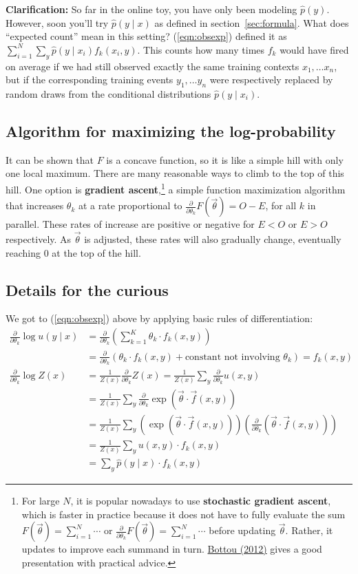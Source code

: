\documentclass[11pt]{article}
\newcommand{\vtheta}{\vec{\theta}}
\newcommand{\ph}{\hat{p}}
\newcommand{\diffk}{\frac{\partial}{\partial \theta_k}}
\begin{document}
{\bf Clarification:} So far in the online toy, you have only been
modeling $\ph(y)$.  However, soon you'll try $\ph(y\mid x)$ as
defined in section~\ref{sec:formula}.  What does ``expected count'' mean in this
setting?  (\ref{eqn:obsexp}) defined it as $\sum_{i=1}^N \sum_y
\ph(y\mid x_i) f_k(x_i,y)$.  This counts how many times $f_k$ would
have fired on average if we had still observed exactly the same
training contexts $x_1,\ldots x_n$, but if the corresponding training events
$y_1,\ldots y_n$ were respectively replaced by random draws from the
conditional distributions $\ph(y \mid x_i)$.

\subsection{Algorithm for maximizing the log-probability}

It can be shown that $F$ is a concave function, so it is like a simple hill with only one local maximum.  There are many reasonable ways to climb to the top of this hill.  One option is {\bf gradient ascent},\footnote{\label{fn:sgd}For large $N$, it is popular nowadays to use
  {\bf stochastic gradient ascent}, which is faster in practice because it does not have to fully evaluate the sum $F(\vtheta) = \sum_{i=1}^N \cdots$ or $\diffk F(\vtheta) = \sum_{i=1}^N \cdots$ before updating $\vtheta$.  Rather, it updates to improve each summand in turn.  \href{http://research.microsoft.com/pubs/192769/tricks-2012.pdf}{Bottou (2012)} gives a good presentation with practical advice.} a
simple function maximization algorithm that increases $\theta_k$ at a
rate proportional to $\diffk F(\vtheta)=O-E$, for all $k$ in parallel.
These rates of increase are positive or negative for $E < O$ or $E >
O$ respectively.  As $\vtheta$ is adjusted, these rates will also
gradually change, eventually reaching 0 at the top of the hill.

\subsection{Details for the curious}

We got to (\ref{eqn:obsexp}) above by applying basic rules
of differentiation:
\begin{align}
  \diffk \log u(y \mid x)
  &= \diffk \left( \sum_{k=1}^K \theta_k \cdot f_k(x,y) \right) \\
  & = \diffk \left( \theta_k \cdot f_k(x,y) + \textrm{constant not involving $\theta_k$} \right) = f_k(x,y)\\
%
  \diffk \log Z(x) &= \frac{1}{Z(x)} \diffk Z(x)
  = \frac{1}{Z(x)} \sum_y \diffk u(x,y)  \\
  &= \frac{1}{Z(x)} \sum_y \diffk \exp (\vtheta \cdot \vec{f}(x,y))\\
  &= \frac{1}{Z(x)} \sum_y \left( \exp (\vtheta \cdot \vec{f}(x,y)) \right)
  \left( \diffk (\vtheta \cdot \vec{f}(x,y)) \right) \\
  &= \frac{1}{Z(x)} \sum_y u(x,y) \cdot f_k(x,y) \\
  &= \sum_y \ph(y\mid x) \cdot f_k(x,y)
\end{align}
\end{document}

